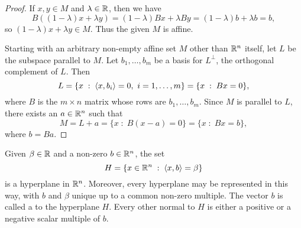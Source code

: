 \documentclass[11pt,a4paper]{article}
\begin{document}
\begin{proof}
    \forward If $x,y\in M$ and $\lambda\in \mathbb{R}$, then we have
    \begin{equation*}
        B((1-\lambda) x + \lambda y) = (1-\lambda) Bx + \lambda By = (1-\lambda) b + \lambda b = b,
    \end{equation*}
    so $(1-\lambda) x + \lambda y\in M$. Thus the given $M$ is affine.

    \noindent\converse Starting with an arbitrary non-empty affine set $M$ other than $\mathbb{R}^n$ itself, let $L$ be the subspace parallel to $M$. Let $b_1,\ldots, b_m$ be a basis for $L^{\perp}$, the orthogonal complement of $L$. Then
    \begin{equation*}
        L = \{x\;:\; \langle x, b_i \rangle = 0,\ i = 1,\ldots, m\} = \{x\;:\; Bx = 0\},
    \end{equation*}
    where $B$ is the $m\times n$ matrix whose rows are $b_1,\ldots, b_m$. Since $M$ is parallel to $L$, there exists an $a\in \mathbb{R}^n$ such that
    \begin{equation*}
        M = L+a = \{x\;:\; B(x-a) = 0\} = \{x\;:\; Bx = b\},
    \end{equation*}
    where $b = Ba$.
\end{proof}

\begin{corollary}
    Given $\beta\in \mathbb{R}$ and a non-zero $b\in \mathbb{R}^n$, the set
    \begin{equation*}
        H = \{ x\in \mathbb{R}^n \;:\; \langle x, b \rangle = \beta \}
    \end{equation*}
    is a hyperplane in $\mathbb{R}^n$. Moreover, every hyperplane may be represented in this way, with $b$ and $\beta$ unique up to a common non-zero multiple. The vector $b$ is called a  to the hyperplane $H$. Every other normal to $H$ is either a positive or a negative scalar multiple of $b$.
\end{corollary}

\end{document}
